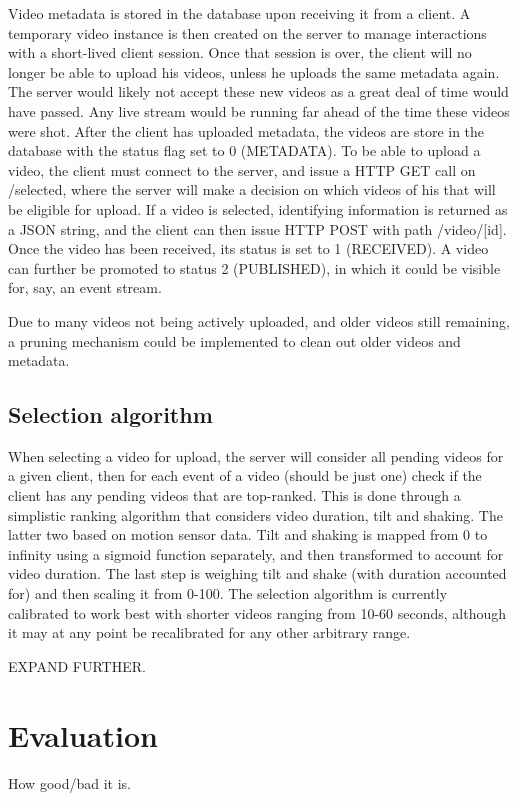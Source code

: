 \documentclass[conference]{IEEEtran}
\begin{document}
Video metadata is stored in the database upon receiving it from a client. A temporary video instance
is then created on the server to manage interactions with a short-lived client session. Once that session
is over, the client will no longer be able to upload his videos, unless he uploads the same metadata again.
The server would likely not accept these new videos as a great deal of time would have passed. Any live stream
would be running far ahead of the time these videos were shot. After the client has uploaded metadata, the
videos are store in the database with the status flag set to 0 (METADATA). To be able to upload a video,
the client must connect to the server, and issue a HTTP GET call on /selected, where the server will make
a decision on which videos of his that will be eligible for upload. If a video is selected, identifying
information is returned as a JSON string, and the client can then issue HTTP POST with path /video/[id].
Once the video has been received, its status is set to 1 (RECEIVED). A video can further be promoted to
status 2 (PUBLISHED), in which it could be visible for, say, an event stream.

Due to many videos not being actively uploaded, and older videos still remaining, a pruning mechanism could
be implemented to clean out older videos and metadata.

\subsection{Selection algorithm}

When selecting a video for upload, the server will consider all pending videos for a given client,
then for each event of a video (should be just one) check if the client has any pending videos that
are top-ranked. This is done through a simplistic ranking algorithm that considers video duration, tilt
and shaking. The latter two based on motion sensor data. Tilt and shaking is mapped from 0 to infinity
using a sigmoid function separately, and then transformed to account for video duration. The last step
is weighing tilt and shake (with duration accounted for) and then scaling it from 0-100.
The selection algorithm is currently calibrated to work best with shorter videos ranging from 10-60 seconds,
although it may at any point be recalibrated for any other arbitrary range.

EXPAND FURTHER.

\section{Evaluation}
How good/bad it is.
\end{document}
